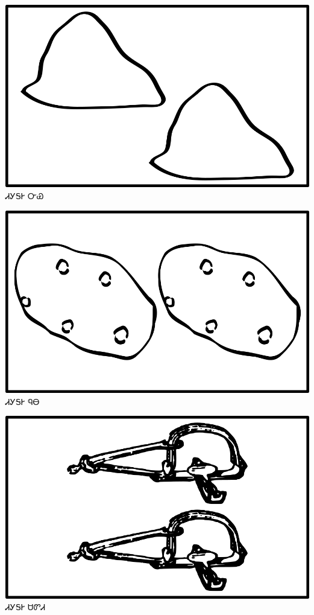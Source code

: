 \documentclass[avery5371]{flashcards}%
\begin{document}
    \begin{flashcard}{
        \includegraphics[width=0.95\columnwidth,height=.51\columnwidth,keepaspectratio]{../artwork/objects-neutral/tali-nvya}
    }
        \Huge ᏗᎩᎦᎨ ᏅᏯ
    \end{flashcard}

    \begin{flashcard}{
        \includegraphics[width=0.95\columnwidth,height=.51\columnwidth,keepaspectratio]{../artwork/objects-neutral/tali-nuna}
    }
        \Huge ᏗᎩᎦᎨ ᏄᎾ
    \end{flashcard}

    \begin{flashcard}{
        \includegraphics[width=0.95\columnwidth,height=.51\columnwidth,keepaspectratio]{../artwork/objects-neutral/tali-sadvdi}
    }
        \Huge ᏗᎩᎦᎨ ᏌᏛᏗ
    \end{flashcard}
\end{document}
